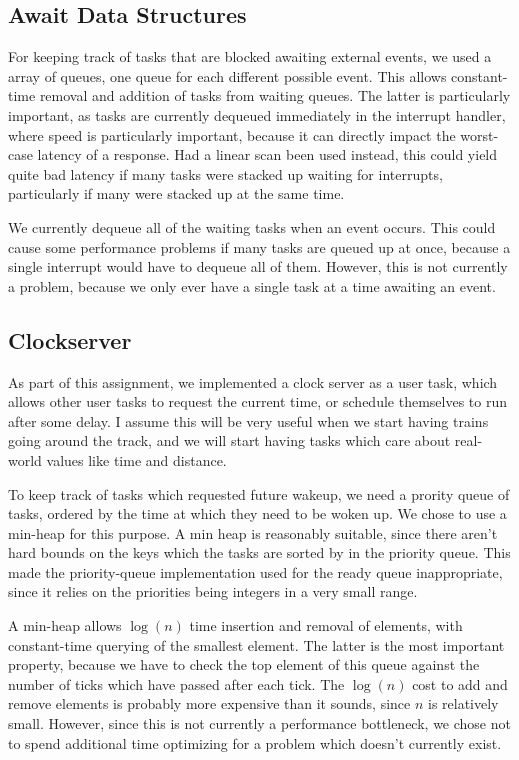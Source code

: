 \documentclass[titlepage]{article}
\begin{document}
\subsection{Await Data Structures}
For keeping track of tasks that are blocked awaiting external events, we used
a array of queues, one queue for each different possible event. This allows
constant-time removal and addition of tasks from waiting queues. The latter
is particularly important, as tasks are currently dequeued immediately in the
interrupt handler, where speed is particularly important, because it can
directly impact the worst-case latency of a response. Had a linear scan been
used instead, this could  yield quite bad latency if many tasks were stacked
up waiting for interrupts, particularly if many were stacked up at the same
time.

We currently dequeue all of the waiting tasks when an event occurs. This could
cause some performance problems if many tasks are queued up at once, because
a single interrupt would have to dequeue all of them. However, this is not
currently a problem, because we only ever have a single task at a time
awaiting an event.

\subsection{Clockserver}
As part of this assignment, we implemented a clock server as a user task, which
allows other user tasks to request the current time, or schedule themselves to run
after some delay.
I assume this will be very useful
when we start having trains going around the track, and we will start having
tasks which care about real-world values like time and distance.

To keep track of tasks which requested future wakeup, we need a prority queue
of tasks, ordered by the time at which they need to be woken up.
We chose to use a min-heap for this purpose.
A min heap is reasonably suitable, since there aren't hard bounds on
the keys which the tasks are sorted by in the priority queue.
This made the priority-queue implementation used for the ready queue inappropriate,
since it relies on the priorities being integers in a very small range.

A min-heap allows $\log(n)$ time insertion and removal of elements, with
constant-time querying of the smallest element.
The latter is the most important property, because we have to check the top
element of this queue against the number of ticks which have passed after each tick.
The $\log(n)$ cost to add and remove elements is probably more expensive than it
sounds, since $n$ is relatively small.
However, since this is not currently a performance bottleneck, we chose not to spend
additional time optimizing for a problem which doesn't currently exist.
\end{document}
